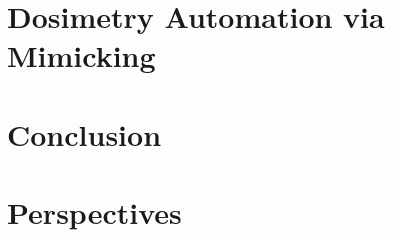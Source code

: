 \documentclass[a4paper,12pt]{book}
\begin{document}
	\graphicspath{ {../6_automation_mimicking/} }
	\chapter{Dosimetry Automation via Mimicking}
	\begin{chapterabstract}
		
	\end{chapterabstract}
	\clearpage
	\localtableofcontents
	
	
	\graphicspath{ {../7_conclusion/} }
	\chapter{Conclusion}
	
	\chapter{Perspectives}
	
	
	
	
\end{document}
